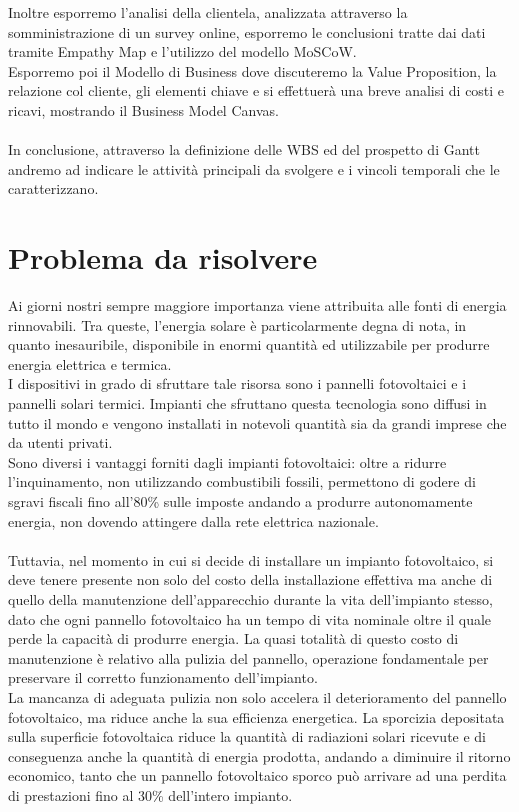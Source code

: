\documentclass[a4paper, 12pt]{article}
\begin{document}
	Inoltre esporremo l'analisi della clientela, analizzata attraverso la somministrazione di un survey online, esporremo le conclusioni tratte dai dati tramite Empathy Map e l'utilizzo del modello MoSCoW.\\
	Esporremo poi il Modello di Business dove discuteremo la Value Proposition, la relazione col cliente, gli elementi chiave e si effettuerà una breve analisi di costi e ricavi, mostrando il Business Model Canvas.\\\\
	In conclusione, attraverso la definizione delle WBS ed del prospetto di Gantt andremo ad indicare le attività principali da svolgere e i vincoli temporali che le caratterizzano.
	\newpage
	\section{Problema da risolvere}
	Ai giorni nostri sempre maggiore importanza viene attribuita alle fonti di energia rinnovabili. Tra queste, l'energia solare è particolarmente degna di nota, in quanto inesauribile, disponibile in enormi quantità ed utilizzabile per produrre energia elettrica e termica.\\
	I dispositivi in grado di sfruttare tale risorsa sono i pannelli fotovoltaici e i pannelli solari termici. Impianti che sfruttano questa tecnologia sono diffusi in tutto il mondo e vengono installati in notevoli quantità sia da grandi imprese che da utenti privati.\\
	Sono diversi i vantaggi forniti dagli impianti fotovoltaici: oltre a ridurre l'inquinamento, non utilizzando combustibili fossili, permettono di godere di sgravi fiscali fino all'80\% sulle imposte andando a produrre autonomamente energia, non dovendo attingere dalla rete elettrica nazionale.\\\\
	Tuttavia, nel momento in cui si decide di installare un impianto fotovoltaico, si deve tenere presente non solo del costo della installazione effettiva ma anche di quello della manutenzione dell'apparecchio durante la vita dell'impianto stesso, dato che ogni pannello fotovoltaico ha un tempo di vita nominale oltre il quale perde la capacità di produrre energia. La quasi totalità di questo costo di manutenzione è relativo alla pulizia del pannello, operazione fondamentale per preservare il corretto funzionamento dell'impianto.\\
	La mancanza di adeguata pulizia non solo accelera il deterioramento del pannello fotovoltaico, ma riduce anche la sua efficienza energetica. La sporcizia depositata sulla superficie fotovoltaica riduce la quantità di radiazioni solari ricevute e di conseguenza anche la quantità di energia prodotta, andando a diminuire il ritorno economico, tanto che un pannello fotovoltaico sporco può arrivare ad una perdita di prestazioni fino al 30\% dell'intero impianto. %
\end{document}
